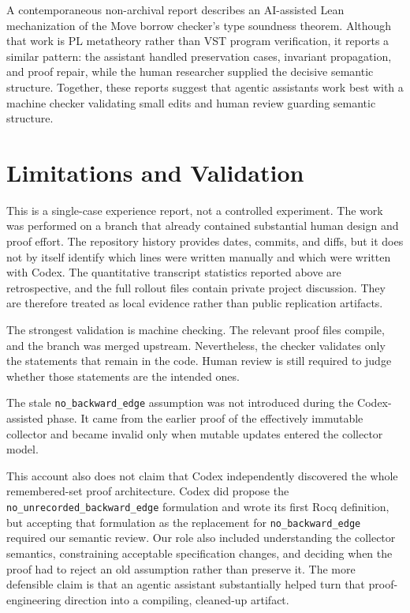 \documentclass[acmsmall,nonacm]{acmart}
\newcommand{\Rocq}{Rocq}
\newcommand{\VST}{VST}
\begin{document}
A contemporaneous non-archival report \citep{sergey2026moveborrow} describes an
AI-assisted Lean mechanization of the Move borrow checker's type soundness
theorem.  Although that work is PL metatheory rather than \VST{} program
verification, it reports a similar pattern: the assistant handled preservation
cases, invariant propagation, and proof repair, while the human researcher
supplied the decisive semantic structure.  Together, these reports suggest that
agentic assistants work best with a machine checker validating small edits and
human review guarding semantic structure.

\section{Limitations and Validation}

This is a single-case experience report, not a controlled experiment.  The work
was performed on a branch that already contained substantial human design and
proof effort.  The repository history provides dates, commits, and diffs, but it
does not by itself identify which lines were written manually and which were
written with Codex.  The quantitative transcript statistics reported above are
retrospective, and the full rollout files contain private project discussion.
They are therefore treated as local evidence rather than public replication
artifacts.

The strongest validation is machine checking.  The relevant proof files compile,
and the branch was merged upstream.  Nevertheless, the checker validates only
the statements that remain in the code.  Human review is still required to judge
whether those statements are the intended ones.

The stale \texttt{no\_backward\_edge} assumption was not introduced during the
Codex-assisted phase.  It came from the earlier proof of the effectively
immutable collector and became invalid only when mutable updates entered the
collector model.

This account also does not claim that Codex independently discovered the whole
remembered-set proof architecture.  Codex did propose the
\texttt{no\_unrecorded\_backward\_edge} formulation and wrote its first \Rocq{}
definition, but accepting that formulation as the replacement for
\texttt{no\_backward\_edge} required our semantic review.  Our role also
included understanding the collector semantics, constraining acceptable
specification changes, and deciding when the proof had to reject an old
assumption rather than preserve it.  The more defensible claim is that an
agentic assistant substantially helped turn that proof-engineering direction
into a compiling, cleaned-up artifact.
\end{document}
